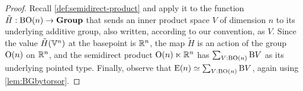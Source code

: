 \begin{proof}
  Recall \cref{def:semidirect-product} and apply it to the function $\tilde H :
  \mathrm B \mathrm O(n) \to \mathbf{Group}$ that sends an inner product space $V$ of
  dimension $n$ to its underlying additive group, also written, according to
  our convention, as $V$.  Since the value $\tilde H ( \mathbb V^n )$ at the
  basepoint is $\mathbb{R}^n$, the map $\tilde H$ is an action of the group
  $\mathrm O(n)$ on $\mathbb{R}^n$, and the semidirect product $\mathrm O(n) \ltimes \mathbb{R}^n$ has
  $\sum_{V:\mathrm B \mathrm O(n)} \mathrm B V$ as its underlying pointed type.
  Finally, observe that $\mathrm E(n) \simeq \sum_{V:\mathrm B \mathrm O(n)} \mathrm B V$, again
  using \cref{lem:BGbytorsor}.
\end{proof}
